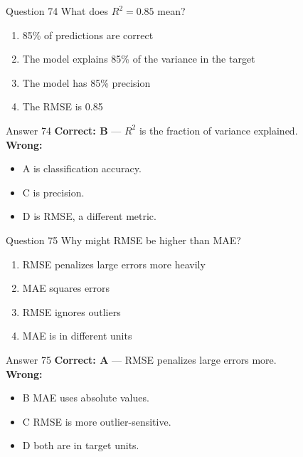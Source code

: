 \documentclass[aspectratio=169,11pt]{beamer}
\begin{document}
	\begin{frame}{Question 74}
		What does $R^2 = 0.85$ mean?
		\begin{enumerate}[label=\Alph*.]
			\item 85\% of predictions are correct
			\item The model explains 85\% of the variance in the target
			\item The model has 85\% precision
			\item The RMSE is 0.85
		\end{enumerate}
	\end{frame}
	\begin{frame}{Answer 74}
		\textbf{Correct: B} --- $R^2$ is the fraction of variance explained.\\
		\vspace{0.5em}
		\textbf{Wrong:}
		\begin{itemize}
			\item A is classification accuracy.
			\item C is precision.
			\item D is RMSE, a different metric.
		\end{itemize}
	\end{frame}
	
	\begin{frame}{Question 75}
		Why might RMSE be higher than MAE?
		\begin{enumerate}[label=\Alph*.]
			\item RMSE penalizes large errors more heavily
			\item MAE squares errors
			\item RMSE ignores outliers
			\item MAE is in different units
		\end{enumerate}
	\end{frame}
	\begin{frame}{Answer 75}
		\textbf{Correct: A} --- RMSE penalizes large errors more.\\
		\vspace{0.5em}
		\textbf{Wrong:}
		\begin{itemize}
			\item B MAE uses absolute values.
			\item C RMSE is more outlier-sensitive.
			\item D both are in target units.
		\end{itemize}
	\end{frame}
	
\end{document}
